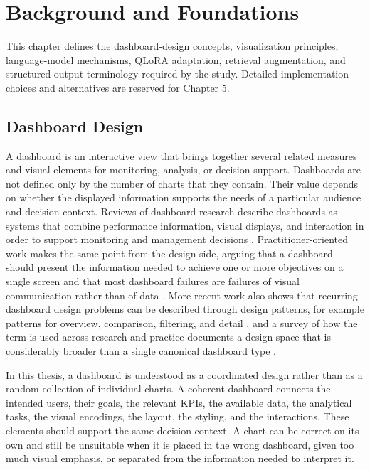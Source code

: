 \chapter{Background and Foundations}

This chapter defines the dashboard-design concepts, visualization principles, language-model mechanisms, QLoRA adaptation, retrieval augmentation, and structured-output terminology required by the study. Detailed implementation choices and alternatives are reserved for Chapter 5.

\section{Dashboard Design}

A dashboard is an interactive view that brings together several related measures and visual elements for monitoring, analysis, or decision support. Dashboards are not defined only by the number of charts that they contain. Their value depends on whether the displayed information supports the needs of a particular audience and decision context. Reviews of dashboard research describe dashboards as systems that combine performance information, visual displays, and interaction in order to support monitoring and management decisions \cite{yigitbasioglu2012dashboard}. Practitioner-oriented work makes the same point from the design side, arguing that a dashboard should present the information needed to achieve one or more objectives on a single screen and that most dashboard failures are failures of visual communication rather than of data \cite{few2006dashboard}. More recent work also shows that recurring dashboard design problems can be described through design patterns, for example patterns for overview, comparison, filtering, and detail \cite{bach2023dashboardpatterns}, and a survey of how the term is used across research and practice documents a design space that is considerably broader than a single canonical dashboard type \cite{sarikaya2019dashboards}.

In this thesis, a dashboard is understood as a coordinated design rather than as a random collection of individual charts. A coherent dashboard connects the intended users, their goals, the relevant KPIs, the available data, the analytical tasks, the visual encodings, the layout, the styling, and the interactions. These elements should support the same decision context. A chart can be correct on its own and still be unsuitable when it is placed in the wrong dashboard, given too much visual emphasis, or separated from the information needed to interpret it.

